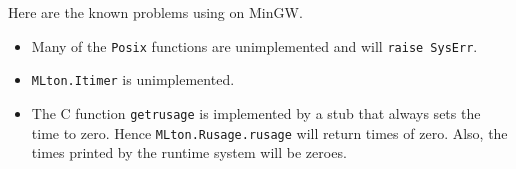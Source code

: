 
Here are the known problems using {\mlton} on MinGW.

\begin{itemize}

\item Many of the {\tt Posix} functions are unimplemented and will
{\tt raise SysErr}.

\item {\tt MLton.Itimer} is unimplemented.

\item The C function {\tt getrusage} is implemented by a stub that
always sets the time to zero.  Hence {\tt MLton.Rusage.rusage} will
return times of zero.  Also, the times printed by the runtime system
will be zeroes.

\end{itemize}
